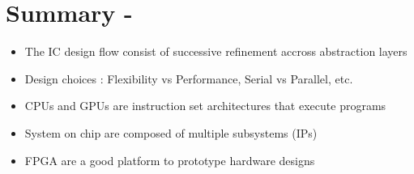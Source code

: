 

\section*{Summary - \insertpart}
\begin{frame}{\insertsection}
 \begin{itemize}
    \item The IC design flow consist of successive refinement accross abstraction layers
    \item Design choices : Flexibility vs Performance, Serial vs Parallel, etc.
    \item CPUs and GPUs are instruction set architectures that execute programs
    \item System on chip are composed of multiple subsystems (IPs)
    \item FPGA are a good platform to prototype hardware designs
 \end{itemize}
\end{frame}